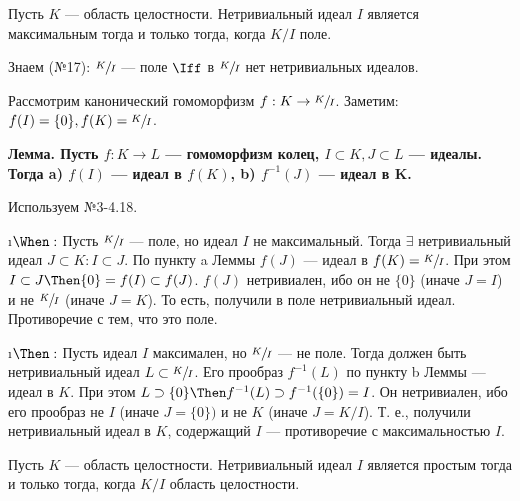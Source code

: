 \begin{problem}
Пусть $K$ --- область целостности. Нетривиальный идеал $I$ является максимальным тогда и только тогда, когда $K/I$ поле.
\end{problem}

\begin{solution}
Знаем (№17): \(\sfrac{K}{I}\) --- поле \(\Iff\) в \(\sfrac{K}{I}\) нет нетривиальных идеалов.

Рассмотрим канонический гомоморфизм \(f: K \to \sfrac{K}{I}\). Заметим: $f(I) = \{0\}, f(K) = \sfrac{K}{I}$.

\bf{Лемма.} Пусть \(f: K \to L\) --- гомоморфизм колец, \(I \subset K, J \subset L\) --- идеалы. Тогда a) \(f(I)\) --- идеал в \(f (K)\), b) \(f^{-1} (J)\) --- идеал в K.

Используем №3-4.18.
\begin{itemize}
\i $\When:$ Пусть $\sfrac{K}{I}$ --- поле, но идеал $I$ не максимальный. Тогда $\exists$ нетривиальный идеал $J \subset K: I \subset J$.
По пункту a Леммы $f(J)$ --- идеал в $f(K) = \sfrac{K}{I}$. При этом $I \subset J \Then \{0\} = f(I) \subset f(J)$. $f(J)$ нетривиален, ибо он не $\{0\}$ (иначе $J=I$) и не $\sfrac{K}{I}$ (иначе $J=K$). То есть, получили в поле нетривиальный идеал. Противоречие с тем, что это поле.

\i $\Then:$ Пусть идеал $I$ максимален, но $\sfrac{K}{I}$ --- не поле. Тогда должен быть нетривиальный идеал $L \subset \sfrac{K}{I}$. Его прообраз $f^{-1}(L)$ по пункту b Леммы --- идеал в $K$. При этом $L \supset \{0\} \Then f^{-1}(L) \supset f^{-1}(\{0\}) = I$. Он нетривиален, ибо его прообраз не $I$ (иначе $J=\{0\})$ и не $K$ (иначе $J = K/I$). Т. е., получили нетривиальный идеал в $K$, содержащий $I$ --- противоречие с максимальностью $I$.
\end{itemize}

\end{solution}

\begin{problem}[22(4.7)]
Пусть $K$ --- область целостности. Нетривиальный идеал $I$ является простым тогда и только тогда, когда $K/I$ область целостности.
\end{problem}

